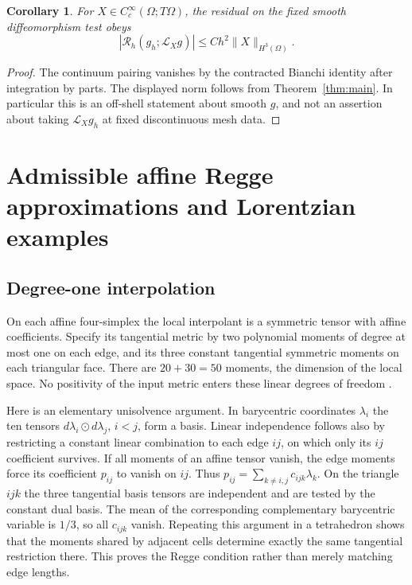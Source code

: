 \documentclass[11pt]{article}
\newtheorem{corollary}[theorem]{Corollary}
\newcommand{\Reg}{\mathcal R}
\begin{document}
\begin{corollary}
For \(X\in C_c^\infty(\Omega;T\Omega)\), the residual on the fixed smooth diffeomorphism test obeys
\[
 |\Reg_h(g_h;\mathcal L_Xg)|\leq C h^2\|X\|_{H^3(\Omega)} .
\]
\end{corollary}
\begin{proof}
The continuum pairing vanishes by the contracted Bianchi identity after integration by parts. The displayed norm follows from Theorem~\ref{thm:main}. In particular this is an off-shell statement about smooth \(g\), and not an assertion about taking \(\mathcal L_Xg_h\) at fixed discontinuous mesh data.
\end{proof}

\section{Admissible affine Regge approximations and Lorentzian examples}

\subsection{Degree-one interpolation}
On each affine four-simplex the local interpolant is a symmetric tensor with affine coefficients. Specify its tangential metric by two polynomial moments of degree at most one on each edge, and its three constant tangential symmetric moments on each triangular face. There are \(20+30=50\) moments, the dimension of the local space. No positivity of the input metric enters these linear degrees of freedom \cite{Christiansen,GN}.

Here is an elementary unisolvence argument. In barycentric coordinates \(\lambda_i\) the ten tensors \(d\lambda_i\odot d\lambda_j\), \(i<j\), form a basis. Linear independence follows also by restricting a constant linear combination to each edge \(ij\), on which only its \(ij\) coefficient survives. If all moments of an affine tensor vanish, the edge moments force its coefficient \(p_{ij}\) to vanish on \(ij\). Thus \(p_{ij}=\sum_{k\ne i,j}c_{ijk}\lambda_k\). On the triangle \(ijk\) the three tangential basis tensors are independent and are tested by the constant dual basis. The mean of the corresponding complementary barycentric variable is \(1/3\), so all \(c_{ijk}\) vanish. Repeating this argument in a tetrahedron shows that the moments shared by adjacent cells determine exactly the same tangential restriction there. This proves the Regge condition rather than merely matching edge lengths.
\end{document}
